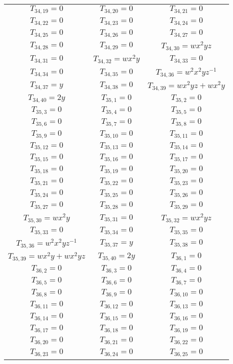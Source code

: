 \documentclass[12pt]{memoireuqam1.3}
\begin{document}
\begin{longtable}{|c|c|c|}
$T_{34,19}= 0$&
$T_{34,20}= 0$&
$T_{34,21}= 0$\\
$T_{34,22}= 0$&
$T_{34,23}= 0$&
$T_{34,24}= 0$\\
$T_{34,25}= 0$&
$T_{34,26}= 0$&
$T_{34,27}= 0$\\
$T_{34,28}= 0$&
$T_{34,29}= 0$&
$T_{34,30}= wx^2yz$\\
$T_{34,31}= 0$&
$T_{34,32}= wx^2y$&
$T_{34,33}= 0$\\
$T_{34,34}= 0$&
$T_{34,35}= 0$&
$T_{34,36}= w^2x^2yz^{-1}$\\
$T_{34,37}= y$&
$T_{34,38}= 0$&
$T_{34,39}= wx^2yz+wx^2y$\\
$T_{34,40}= 2y$&
$T_{35,1}= 0$&
$T_{35,2}= 0$\\
$T_{35,3}= 0$&
$T_{35,4}= 0$&
$T_{35,5}= 0$\\
$T_{35,6}= 0$&
$T_{35,7}= 0$&
$T_{35,8}= 0$\\
$T_{35,9}= 0$&
$T_{35,10}= 0$&
$T_{35,11}= 0$\\
$T_{35,12}= 0$&
$T_{35,13}= 0$&
$T_{35,14}= 0$\\
$T_{35,15}= 0$&
$T_{35,16}= 0$&
$T_{35,17}= 0$\\
$T_{35,18}= 0$&
$T_{35,19}= 0$&
$T_{35,20}= 0$\\
$T_{35,21}= 0$&
$T_{35,22}= 0$&
$T_{35,23}= 0$\\
$T_{35,24}= 0$&
$T_{35,25}= 0$&
$T_{35,26}= 0$\\
$T_{35,27}= 0$&
$T_{35,28}= 0$&
$T_{35,29}= 0$\\
$T_{35,30}= wx^2y$&
$T_{35,31}= 0$&
$T_{35,32}= wx^2yz$\\
$T_{35,33}= 0$&
$T_{35,34}= 0$&
$T_{35,35}= 0$\\
$T_{35,36}= w^2x^2yz^{-1}$&
$T_{35,37}= y$&
$T_{35,38}= 0$\\
$T_{35,39}= wx^2y+wx^2yz$&
$T_{35,40}= 2y$&
$T_{36,1}= 0$\\
$T_{36,2}= 0$&
$T_{36,3}= 0$&
$T_{36,4}= 0$\\
$T_{36,5}= 0$&
$T_{36,6}= 0$&
$T_{36,7}= 0$\\
$T_{36,8}= 0$&
$T_{36,9}= 0$&
$T_{36,10}= 0$\\
$T_{36,11}= 0$&
$T_{36,12}= 0$&
$T_{36,13}= 0$\\
$T_{36,14}= 0$&
$T_{36,15}= 0$&
$T_{36,16}= 0$\\
$T_{36,17}= 0$&
$T_{36,18}= 0$&
$T_{36,19}= 0$\\
$T_{36,20}= 0$&
$T_{36,21}= 0$&
$T_{36,22}= 0$\\
$T_{36,23}= 0$&
$T_{36,24}= 0$&
$T_{36,25}= 0$\\

\end{longtable}
\end{document}
